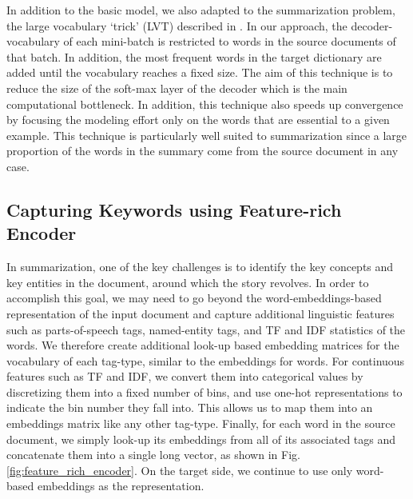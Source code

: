 In addition to the basic model, we also adapted to the summarization problem, the large vocabulary `trick' (LVT) described in . In our approach, the decoder-vocabulary of each mini-batch is restricted to words in the source documents of that batch. In addition, the most frequent words in the target dictionary are added until the vocabulary reaches a fixed size. The aim of this technique is to reduce the size of the soft-max layer of the decoder which is the main computational bottleneck. In addition, this technique also speeds up convergence by focusing the modeling effort only on the words that are essential to a given example. This technique is particularly well suited to summarization since a large proportion of the words in the summary come from the source document in any case.

\subsection{Capturing Keywords using Feature-rich Encoder}\label{sec:feats}
In summarization, one of the key challenges is to identify the key concepts and key entities in the document, around which the story revolves. In order to accomplish this goal, we may need to go beyond the word-embeddings-based representation of the input document and capture additional linguistic features such as parts-of-speech tags, named-entity tags, and TF and IDF statistics of the words. We therefore create additional look-up based embedding matrices for the vocabulary of each tag-type, similar to the embeddings for words. For continuous features such as TF and IDF, we convert them into categorical values by discretizing them into a fixed number of bins, and use one-hot representations to indicate the bin number they fall into. This allows us to map them into an embeddings matrix like any other tag-type. Finally, for each word in the source document, we simply look-up its embeddings from all of its associated tags and concatenate them into a single long vector, as shown in Fig. \ref{fig:feature_rich_encoder}.  
On the target side, we continue to use only word-based embeddings as the representation.

